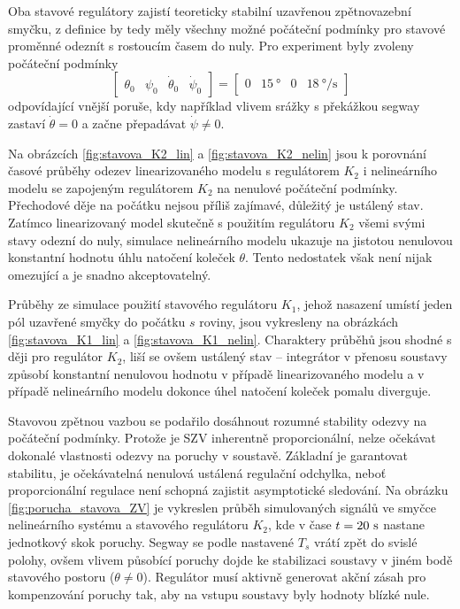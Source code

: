 \documentclass[conference]{IEEEtran}
\begin{document}
Oba stavové regulátory zajistí teoreticky stabilní uzavřenou zpětnovazební smyčku, z definice by tedy měly všechny možné počáteční
podmínky pro stavové proměnné odeznít s rostoucím časem do nuly. Pro experiment byly zvoleny počáteční podmínky
\begin{equation*}
    \begin{bmatrix}
        \theta_0 & \psi_0 & \dot{\theta}_0 & \dot{\psi}_0
    \end{bmatrix} = \begin{bmatrix}
        0 & 15~\si{\degree} & 0 & 18~\si{\degree\per\second}
    \end{bmatrix}
\end{equation*}
odpovídající vnější poruše, kdy například vlivem srážky s překážkou segway zastaví $\dot{\theta} = 0$ a začne přepadávat $\dot{\psi} \neq 0$.


Na obrázcích \ref{fig:stavova_K2_lin} a \ref{fig:stavova_K2_nelin}
jsou k porovnání časové průběhy odezev linearizovaného modelu s regulátorem $K_2$ i nelineárního modelu se zapojeným regulátorem $K_2$ na nenulové počáteční podmínky.
Přechodové děje na počátku nejsou příliš zajímavé, důležitý je ustálený stav. Zatímco linearizovaný model skutečně s použitím regulátoru $K_2$ všemi svými stavy 
odezní do nuly, simulace nelineárního modelu ukazuje na jistotou nenulovou konstantní hodnotu úhlu natočení koleček $\theta$. Tento nedostatek však není nijak omezující
a je snadno akceptovatelný. 


Průběhy ze simulace použití stavového regulátoru $K_1$, jehož nasazení umístí jeden pól uzavřené smyčky do počátku $s$ roviny, jsou vykresleny na obrázkách 
\ref{fig:stavova_K1_lin} a \ref{fig:stavova_K1_nelin}. Charaktery průběhů jsou shodné s ději pro regulátor $K_2$, liší se ovšem ustálený stav -- integrátor v přenosu
soustavy způsobí konstantní nenulovou hodnotu v případě linearizovaného modelu a v případě nelineárního modelu dokonce úhel natočení koleček pomalu diverguje.

Stavovou zpětnou vazbou se podařilo dosáhnout rozumné stability odezvy na počáteční podmínky. Protože je SZV inherentně proporcionální, nelze očekávat
dokonalé vlastnosti odezvy na poruchy v soustavě. Základní je garantovat stabilitu, je očekávatelná nenulová ustálená regulační odchylka,
neboť proporcionální regulace není schopná zajistit asymptotické sledování. Na obrázku \ref{fig:porucha_stavova_ZV} je vykreslen průběh simulovaných signálů ve smyčce nelineárního
systému a stavového regulátoru $K_2$, kde v čase $t = 20~\text{\si{\second}}$ nastane jednotkový skok poruchy.
Segway se podle nastavené $T_s$ vrátí zpět do svislé polohy, ovšem vlivem působící poruchy dojde ke stabilizaci soustavy v jiném bodě stavového postoru ($\theta \neq 0$).
Regulátor musí aktivně generovat akční zásah pro kompenzování poruchy tak, aby na vstupu soustavy byly hodnoty blízké nule.
\end{document}
